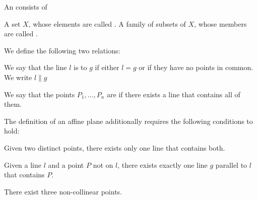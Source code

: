 \begin{definition}\label{def:affine_plane}
  An  consists of
  \begin{thmenum}[series=def:affine_plane]
     A set \( X \), whose elements are called .
     A family of subsets of \( X \), whose members are called .
  \end{thmenum}

  We define the following two relations:
  \begin{thmenum}[resume=def:affine_plane]
     We say that the line \( l \) is  to \( g \) if either \( l = g \) or if they have no points in common. We write \( l \parallel g \)

     We say that the points \( P_1, \ldots, P_n \) are  if there exists a line that contains all of them.
  \end{thmenum}

  The definition of an affine plane additionally requires the following conditions to hold:
  \begin{thmenum}
     Given two distinct points, there exists only one line that contains both.

     Given a line \( l \) and a point \( P \) not on \( l \), there exists exactly one line \( g \) parallel to \( l \) that contains \( P \).

     There exist three non-collinear points.
  \end{thmenum}
\end{definition}

